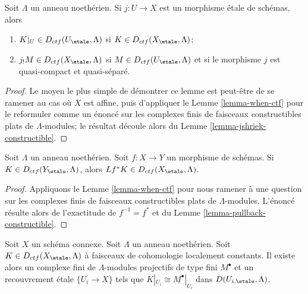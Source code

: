 \begin{lemma}
\label{lemma-restrict-and-shriek-from-etale-ctf}
Soit $\Lambda$ un anneau noethérien.
Si $j : U \to X$ est un morphisme étale de schémas, alors
\begin{enumerate}
\item $K|_U \in D_{ctf}(U_\etale, \Lambda)$ si
$K \in D_{ctf}(X_\etale, \Lambda)$;
\item $j_!M \in D_{ctf}(X_\etale, \Lambda)$ si
$M \in D_{ctf}(U_\etale, \Lambda)$ et si
le morphisme $j$ est quasi-compact et quasi-séparé.
\end{enumerate}
\end{lemma}

\begin{proof}
Le moyen le plus simple de démontrer ce lemme est peut-être de se ramener au
cas où $X$ est affine, puis d'appliquer le Lemme \ref{lemma-when-ctf}
pour le reformuler comme un énoncé sur les complexes finis
de faisceaux constructibles plats de $\Lambda$-modules;
le résultat découle alors du Lemme \ref{lemma-jshriek-constructible}.
\end{proof}

\begin{lemma}
\label{lemma-pullback-ctf}
Soit $\Lambda$ un anneau noethérien. Soit $f : X \to Y$ un morphisme de schémas.
Si $K \in D_{ctf}(Y_\etale, \Lambda)$, alors
$Lf^*K \in D_{ctf}(X_\etale, \Lambda)$.
\end{lemma}

\begin{proof}
Appliquons le Lemme \ref{lemma-when-ctf} pour nous ramener à une question
sur les complexes finis de faisceaux constructibles plats de $\Lambda$-modules.
L'énoncé résulte alors de l'exactitude de $f^{-1} = f^*$ et du
Lemme \ref{lemma-pullback-constructible}.
\end{proof}

\begin{lemma}
\label{lemma-connected-ctf-locally-constant}
Soit $X$ un schéma connexe. Soit $\Lambda$ un anneau noethérien.
Soit $K \in D_{ctf}(X_\etale, \Lambda)$ à faisceaux de cohomologie localement constants.
Il existe alors un complexe fini de $\Lambda$-modules projectifs de type fini
$M^\bullet$ et un recouvrement étale $\{U_i \to X\}$ tels que
$K|_{U_i} \cong \underline{M^\bullet}|_{U_i}$ dans $D(U_{i, \etale}, \Lambda)$.
\end{lemma}

